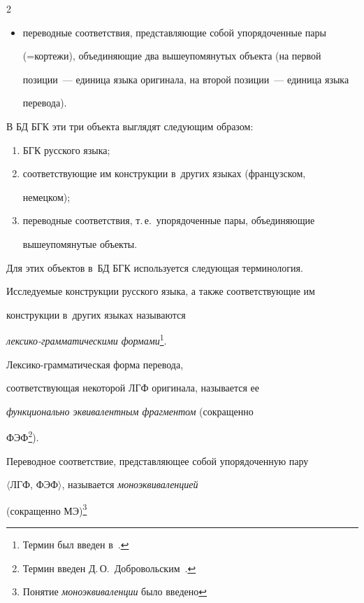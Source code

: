 \begin{multicols}{2}
\begin{itemize}
\item переводные соответствия, представляющие собой упорядоченные пары 

(=\;кор\-те\-жи), объединяющие два вышеупомянутых объекта (на первой 

позиции~--- единица языка оригинала, на второй позиции~--- единица языка 

перевода). 

\end{itemize}

  

  В БД БГК эти три объекта выглядят следующим образом:

  \begin{enumerate}[(1)]

\item БГК русского языка;

\item соответствующие им конструкции в~других языках (французском, 

немецком);

\item переводные соответствия, т.\,е.\ упорядоченные пары, объединяющие 

вышеупомянутые объ\-екты. 

\end{enumerate}



  Для этих объектов в~БД БГК используется следующая терминология. 

Исследуемые конструкции русского языка, а также соответствующие им 

конструкции в~других языках называются  

\textit{лек\-си\-ко-грам\-ма\-ти\-че\-ски\-ми формами}\footnote{Термин был введен в~\cite{12-kr}.}. 

Лек\-си\-ко-грам\-ма\-ти\-че\-ская форма перевода, 

соответствующая некоторой ЛГФ оригинала, называется ее 

\textit{функционально эквивалентным фрагментом} (сокращенно 

ФЭФ\footnote{Термин введен Д.\,О.~Добровольским~\cite{13-kr, 14-kr}.}). 

Переводное соответствие, представляющее собой упорядоченную пару 

$\langle$ЛГФ, ФЭФ$\rangle$, называется \textit{моноэквиваленцией} 

(сокращенно МЭ)\footnote{Понятие \textit{моноэквиваленции} было введено 

}
\end{multicols}
